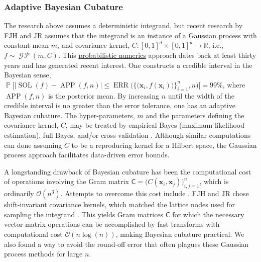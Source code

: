 \documentclass[11pt]{NSFamsart}
\DeclareMathOperator{\GP}{\mathcal{G} \! \mathcal{P}}
\newcommand{\reals}{{\mathbb{R}}}
\newcommand{\mC}{\mathsf{C}}
\DeclareMathOperator{\SOL}{SOL}
\DeclareMathOperator{\APP}{APP}
\DeclareMathOperator{\ERR}{ERR}
\newcommand{\bx}{{\boldsymbol{x}}}
\DeclareMathOperator{\Prob}{\mathbb{P}}
\def\abs#1{\ensuremath{\left \lvert #1 \right \rvert}}
\newcommand{\Order}{\mathcal{O}}
\newcommand{\dataN}{\bigl\{\bigl(\bx_i,f(\bx_i)\bigr)\bigr\}_{i=1}^n}
\newcommand{\ErrN}{\ERR\bigl(\dataN,n\bigr)}
\begin{document}
\subsubsection{Adaptive Bayesian Cubature}  \label{sec:Bayes} 
The research above assumes a deterministic integrand, but recent research by FJH and JR assumes that the integrand is an instance of a Gaussian process with constant mean $m$, and covariance kernel, $C:[0,1]^d \times [0,1]^d \to \reals$, i.e., 
$f \sim \GP (m,C)$.  This \href{http://www.probabilistic-numerics.org}{probabilistic numerics} approach dates back at least thirty years \cite{Dia88a, OHa91a, RasGha03a, Rit00a} and has generated recent interest. One constructs a credible interval in the Bayesian sense, $\Prob\bigl[\abs{\SOL(f) 
- \APP(f,n)} \le \ErrN \bigr] = 99\%$, where $\APP(f,n)$ is the posterior mean.  By increasing $n$ until the width of the credible interval is no greater than the error tolerance, one has an adaptive Bayesian cubature.  The hyper-parameters, $m$ and the parameters defining the covariance kernel, $C$, may be treated by empirical Bayes (maximum likelihood estimation), full Bayes, and/or cross-validation \cite{RatHic19a}.  Although similar computations can done assuming $C$ to be a reproducing kernel for a Hilbert space, the Gaussian process approach facilitates data-driven error bounds.

A longstanding drawback of Bayesian cubature has been the computational cost of operations
involving the Gram matrix $\mC = \bigl(C(\bx_i,\bx_j)\bigr)_{i,j=1}^n$, which is ordinarily
$\Order(n^3)$.  Attempts to overcome this cost include \cite{AniCheSte16a, ParEtal17a}.  FJH and JR chose shift-invariant covariance kernels, which matched the lattice nodes used for sampling the integrand \cite{RatHic19a}. This yields Gram matrices $\mC$ for which the necessary vector-matrix operations can be accomplished by fast transforms with computational cost $\Order(n 
\log(n))$, making Bayesian cubature practical.  We also found a way to avoid the round-off error that often plagues these Gaussian process methods for large $n$.
\end{document}
